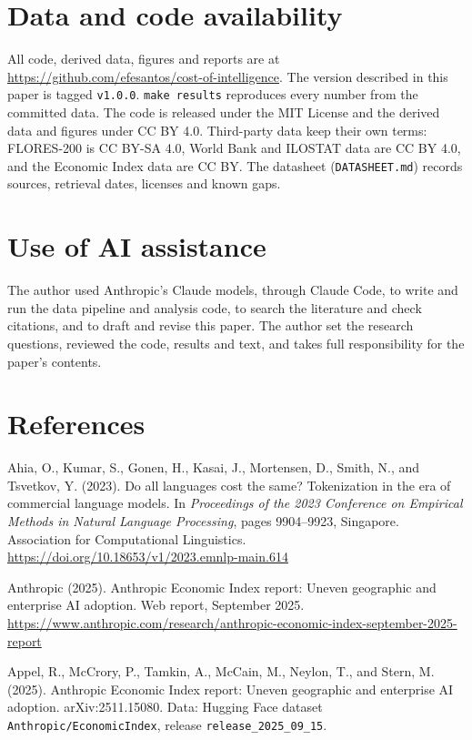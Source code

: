 \documentclass[11pt]{article}
\begin{document}
\section{Data and code availability}

All code, derived data, figures and reports are at \url{https://github.com/efesantos/cost-of-intelligence}. The version described in this paper is tagged \texttt{v1.0.0}. \texttt{make\ results} reproduces every number from the committed data. The code is released under the MIT License and the derived data and figures under CC BY 4.0. Third-party data keep their own terms: FLORES-200 is CC BY-SA 4.0, World Bank and ILOSTAT data are CC BY 4.0, and the Economic Index data are CC BY. The datasheet (\texttt{DATASHEET.md}) records sources, retrieval dates, licenses and known gaps.

\section{Use of AI assistance}

The author used Anthropic's Claude models, through Claude Code, to write and run the data pipeline and analysis code, to search the literature and check citations, and to draft and revise this paper. The author set the research questions, reviewed the code, results and text, and takes full responsibility for the paper's contents.

\section{References}

\begingroup\small\setlength{\parindent}{-1.5em}\setlength{\leftskip}{1.5em}\setlength{\parskip}{3pt}\everypar{}

Ahia, O., Kumar, S., Gonen, H., Kasai, J., Mortensen, D., Smith, N., and Tsvetkov, Y. (2023). Do all languages cost the same? Tokenization in the era of commercial language models. In \emph{Proceedings of the 2023 Conference on Empirical Methods in Natural Language Processing}, pages 9904--9923, Singapore. Association for Computational Linguistics. \url{https://doi.org/10.18653/v1/2023.emnlp-main.614}

Anthropic (2025). Anthropic Economic Index report: Uneven geographic and enterprise AI adoption. Web report, September 2025. \url{https://www.anthropic.com/research/anthropic-economic-index-september-2025-report}

Appel, R., McCrory, P., Tamkin, A., McCain, M., Neylon, T., and Stern, M. (2025). Anthropic Economic Index report: Uneven geographic and enterprise AI adoption. arXiv:2511.15080. Data: Hugging Face dataset \texttt{Anthropic/EconomicIndex}, release \texttt{release\_2025\_09\_15}.
\end{document}
